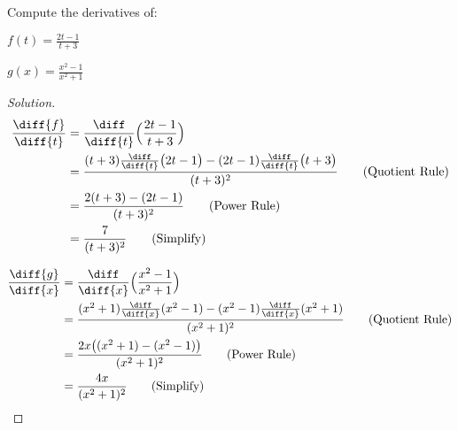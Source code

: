 \documentclass[crop=false,class=article,oneside]{standalone}
\begin{document}
            \begin{problem}
                Compute the derivatives of:
                \begin{enumerate}[label=(\alph*)]
                    \begin{multicols}{2}
                        \item $f(t)=\frac{2t-1}{t+3}$
                        \item $g(x)=\frac{x^{2}-1}{x^{2}+1}$
                    \end{multicols}
                \end{enumerate}
            \end{problem}
            \begin{proof}[Solution]
                \par\hfill\par
                \begin{minipage}[b]{.49\textwidth}
                    \centering
                    \begin{align*}
                        \frac{\diff{f}}{\diff{t}}
                        &=\frac{\diff}{\diff{t}}
                            \Big(\frac{2t-1}{t+3}\Big)\\
                        &=\frac{(t+3)\frac{\diff}{\diff{t}}
                                \big(2t-1\big)-
                                (2t-1)\frac{\diff}{\diff{t}}
                                \big(t+3\big)}
                               {(t+3)^{2}}
                               \tag{Quotient Rule}\\
                        &=\frac{2(t+3)-(2t-1)}{(t+3)^{2}}
                            \tag{Power Rule}\\
                        &=\frac{7}{(t+3)^{2}}
                            \tag{Simplify}
                    \end{align*}
                \end{minipage}
                \hfill
                \vline
                \begin{minipage}[b]{.49\textwidth}
                    \centering
                    \begin{align*}
                        \frac{\diff{g}}{\diff{x}}
                        &=\frac{\diff}{\diff{x}}
                            \Big(\frac{x^{2}-1}{x^{2}+1}\Big)\\
                        &=\frac{(x^{2}+1)\frac{\diff}{\diff{x}}
                                (x^{2}-1)-(x^{2}-1)
                                \frac{\diff}{\diff{x}}(x^{2}+1)}
                               {(x^{2}+1)^{2}}
                               \tag{Quotient Rule}\\
                        &=\frac{2x\big((x^{2}+1)-(x^{2}-1)\big)}
                               {(x^{2}+1)^{2}}
                               \tag{Power Rule}\\
                        &=\frac{4x}{(x^{2}+1)^{2}}
                            \tag{Simplify}
                    \end{align*}
                \end{minipage}
            \end{proof}
\end{document}
